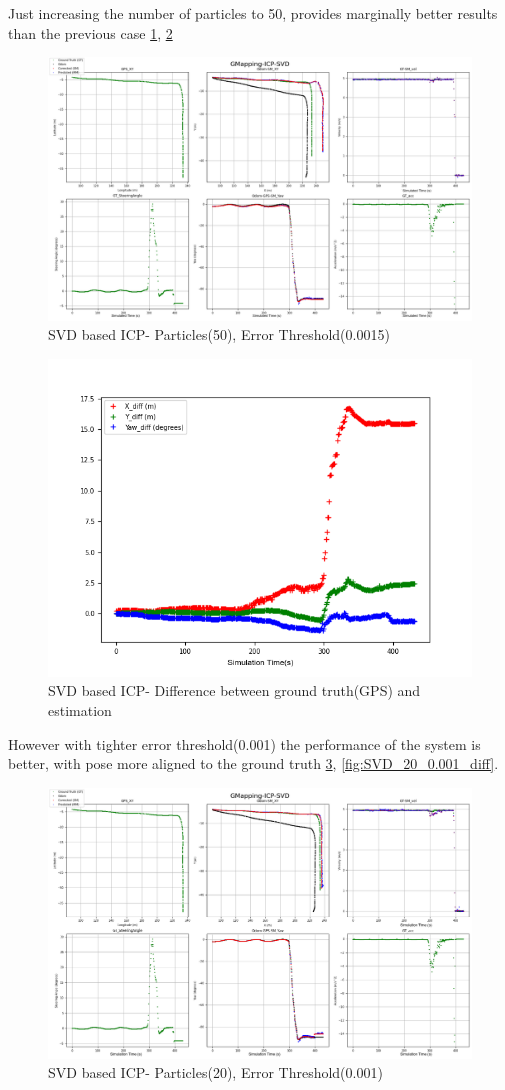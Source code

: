\clearpage
Just increasing the number of particles to 50, provides marginally better results than the previous case \ref{fig:SVD_50_0.0015}, \ref{fig:SVD_50_0.0015_diff}
    \begin{figure}[h] 
        \includegraphics[height=0.6\textwidth]{images/GMapping-ICP-SVD_Map_50_0.0015.png}
        \caption{SVD based ICP- Particles(50), Error Threshold(0.0015)}
        \label{fig:SVD_50_0.0015}
    \end{figure}
    \begin{figure}[h]
        \includegraphics[height=0.4\textwidth]{images/GMapping-ICP-SVD_True_vs_Crct_50_0.0015.png}
        \caption{SVD based ICP- Difference between ground truth(GPS) and estimation}
        \label{fig:SVD_50_0.0015_diff}
    \end{figure}
\clearpage
However with tighter error threshold(0.001) the performance of the system is better, with pose more aligned to the ground truth \ref{fig:SVD_20_0.001}, \ref{fig:SVD_20_0.001_diff}.
    \begin{figure}[h] 
        \includegraphics[height=0.6\textwidth]{images/GMapping-ICP-SVD_Map_20_0.001.png}
        \caption{SVD based ICP- Particles(20), Error Threshold(0.001)}
        \label{fig:SVD_20_0.001}
    \end{figure}

